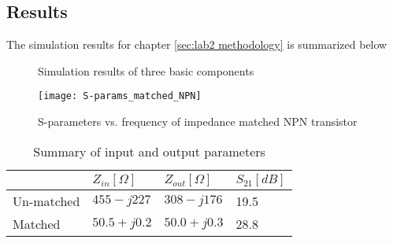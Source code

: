 \documentclass[report.tex]{subfiles}
\begin{document}
\clearpage
\subsection{Results}
\label{sec:lab2_results}
The simulation results for chapter \ref{sec:lab2 methodology} is summarized below

\begin{figure}[h]
    \centering
    \caption{Simulation results of three basic components}
\end{figure}
\clearpage

\clearpage

\begin{figure}
    \centering
    \texttt{[image: S-params\_matched\_NPN]}
    \caption{S-parameters vs. frequency of impedance matched NPN transistor}
\end{figure}

\begin{table}
    \centering
    \caption{Summary of input and output parameters}
    \begin{tabular}{l | l l l}
        & $Z_{in} [\Omega]$ & $Z_{out} [\Omega]$ & $S_{21} [dB]$\\
        \hline
        Un-matched & $455-j227$  & $308-j176$  & 19.5 \\
        Matched    & $50.5+j0.2$ & $50.0+j0.3$ & 28.8 \\
    \end{tabular}
\end{table}

\clearpage
\end{document}
